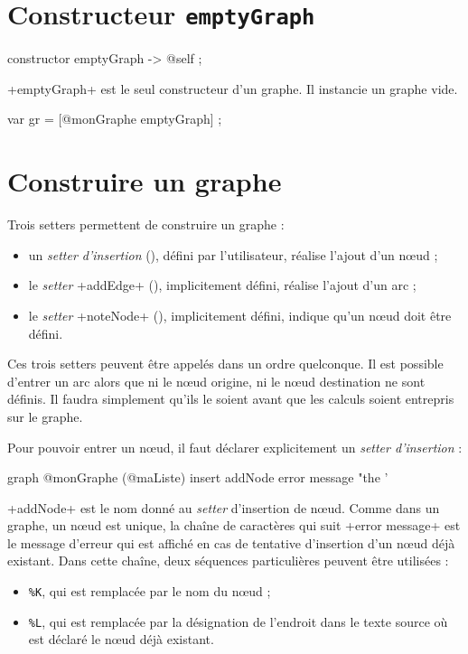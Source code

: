 \section{Constructeur \texttt{emptyGraph}}

\begin{galgascode}
constructor emptyGraph -> @self ;
\end{galgascode}

\ggs+emptyGraph+ est le seul constructeur d'un graphe. Il instancie un graphe vide.

\begin{galgascode}
var gr = [@monGraphe emptyGraph] ;
\end{galgascode}



\section{Construire un graphe}

Trois setters permettent de construire un graphe :
\begin{itemize}
  \item un \emph{setter d'insertion} (), défini par l'utilisateur, réalise l'ajout d'un nœud ;
  \item le \emph{setter} \ggs+addEdge+ (), implicitement défini, réalise l'ajout d'un arc ;
  \item le \emph{setter} \ggs+noteNode+ (), implicitement défini, indique qu'un nœud doit être défini.
\end{itemize}

Ces trois setters peuvent être appelés dans un ordre quelconque. Il est possible d'entrer un arc alors que ni le nœud origine, ni le nœud destination ne sont définis. Il faudra simplement qu'ils le soient avant que les calculs soient entrepris sur le graphe.


Pour pouvoir entrer un nœud, il faut déclarer explicitement un \emph{setter d'insertion} :
\begin{galgascode}
graph @monGraphe (@maListe) {
  insert addNode error message "the '%
}
\end{galgascode}

\ggs+addNode+ est le nom donné au \emph{setter} d'insertion de nœud. Comme dans un graphe, un nœud est unique, la chaîne de caractères qui suit \ggs+error message+ est le message d'erreur qui est affiché en cas de tentative d'insertion d'un nœud déjà existant. Dans cette chaîne, deux séquences particulières peuvent être utilisées :
\begin{itemize}
  \item \texttt{\%K}, qui est remplacée par le nom du nœud ;
  \item \texttt{\%L}, qui est remplacée par la désignation de l'endroit dans le texte source où est déclaré le nœud déjà existant.
\end{itemize}

